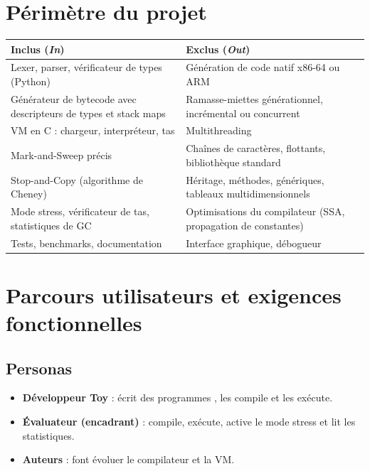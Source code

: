 \documentclass[11pt,a4paper]{article}
\newcommand{\code}[1]{\texttt{\detokenize{#1}}}
\begin{document}
\section{Périmètre du projet}

\begin{longtable}{@{}p{} p{}@{}}
\toprule
\textbf{Inclus (\emph{In})} & \textbf{Exclus (\emph{Out})} \\
\midrule
\endhead
Lexer, parser, vérificateur de types (Python) & Génération de code natif x86-64 ou ARM \\
Générateur de bytecode avec descripteurs de types et stack maps & Ramasse-miettes générationnel, incrémental ou concurrent \\
VM en C : chargeur, interpréteur, tas & Multithreading \\
Mark-and-Sweep précis & Chaînes de caractères, flottants, bibliothèque standard \\
Stop-and-Copy (algorithme de Cheney) & Héritage, méthodes, génériques, tableaux multidimensionnels \\
Mode stress, vérificateur de tas, statistiques de GC & Optimisations du compilateur (SSA, propagation de constantes) \\
Tests, benchmarks, documentation & Interface graphique, débogueur \\
\bottomrule
\end{longtable}

\section{Parcours utilisateurs et exigences fonctionnelles}

\subsection{Personas}
\begin{itemize}
  \item \textbf{Développeur Toy} : écrit des programmes \code{.toy}, les compile et les exécute.
  \item \textbf{Évaluateur (encadrant)} : compile, exécute, active le mode stress et lit les statistiques.
  \item \textbf{Auteurs} : font évoluer le compilateur et la VM.
\end{itemize}
\end{document}
